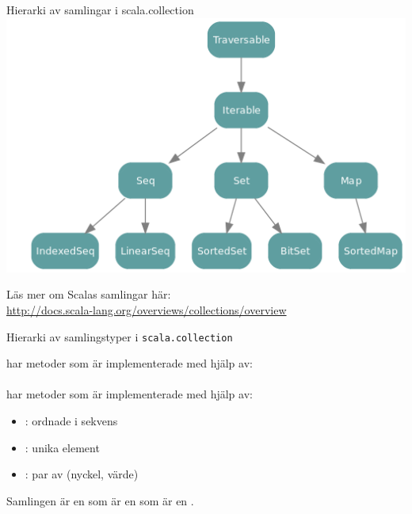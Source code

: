\begin{Slide}{Hierarki av samlingar i scala.collection}
\includegraphics[width=1.0\textwidth]{../img/collection/collection-traits}
\end{Slide}
\noindent Läs mer om Scalas samlingar här: \\ 
\url{http://docs.scala-lang.org/overviews/collections/overview}


\begin{Slide}{Hierarki av samlingstyper i \texttt{scala.collection}}

\begin{multicols}{2}

\columnbreak
 
{\SlideFontTiny 

 har metoder som är implementerade med hjälp av: \\
\\

\vspace{1em} har metoder som är implementerade med hjälp av: \\

}

\begin{itemize}\SlideFontTiny 
\item[] : ordnade i sekvens
\item[] : unika element
\item[] : par av (nyckel, värde)
\end{itemize}


\end{multicols}

{\SlideFontSmall Samlingen  är en  som är en  som är en .}
\end{Slide}

